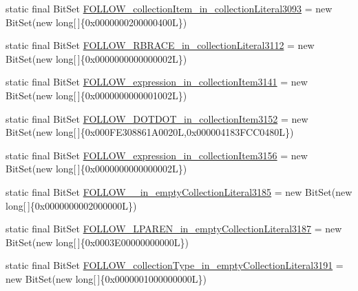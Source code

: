 \begin{DoxyCompactItemize}
\item 
static final Bit\-Set \hyperlink{classorg_1_1tzi_1_1use_1_1parser_1_1testsuite_1_1_test_suite_parser_ac31ee4b7f93a1bf0b5f8b2c54f51bcce}{F\-O\-L\-L\-O\-W\-\_\-collection\-Item\-\_\-in\-\_\-collection\-Literal3093} = new Bit\-Set(new long\mbox{[}$\,$\mbox{]}\{0x0000000200000400\-L\})
\item 
static final Bit\-Set \hyperlink{classorg_1_1tzi_1_1use_1_1parser_1_1testsuite_1_1_test_suite_parser_aa49fe7bf4db7bc2872a9d5f05738c86f}{F\-O\-L\-L\-O\-W\-\_\-\-R\-B\-R\-A\-C\-E\-\_\-in\-\_\-collection\-Literal3112} = new Bit\-Set(new long\mbox{[}$\,$\mbox{]}\{0x0000000000000002\-L\})
\item 
static final Bit\-Set \hyperlink{classorg_1_1tzi_1_1use_1_1parser_1_1testsuite_1_1_test_suite_parser_ad1485a2c0c1046e9fbf8bbceff52b4c1}{F\-O\-L\-L\-O\-W\-\_\-expression\-\_\-in\-\_\-collection\-Item3141} = new Bit\-Set(new long\mbox{[}$\,$\mbox{]}\{0x0000000000001002\-L\})
\item 
static final Bit\-Set \hyperlink{classorg_1_1tzi_1_1use_1_1parser_1_1testsuite_1_1_test_suite_parser_a3b3c2800e465a4a66a7b11663d6661fd}{F\-O\-L\-L\-O\-W\-\_\-\-D\-O\-T\-D\-O\-T\-\_\-in\-\_\-collection\-Item3152} = new Bit\-Set(new long\mbox{[}$\,$\mbox{]}\{0x000\-F\-E308861\-A0020\-L,0x000004183\-F\-C\-C0480\-L\})
\item 
static final Bit\-Set \hyperlink{classorg_1_1tzi_1_1use_1_1parser_1_1testsuite_1_1_test_suite_parser_a23c6501023c6c188a8273095e0747922}{F\-O\-L\-L\-O\-W\-\_\-expression\-\_\-in\-\_\-collection\-Item3156} = new Bit\-Set(new long\mbox{[}$\,$\mbox{]}\{0x0000000000000002\-L\})
\item 
static final Bit\-Set \hyperlink{classorg_1_1tzi_1_1use_1_1parser_1_1testsuite_1_1_test_suite_parser_a9bfd915d94f9bec9d616de6415fad3cc}{F\-O\-L\-L\-O\-W\-\_\-\_\-in\-\_\-empty\-Collection\-Literal3185} = new Bit\-Set(new long\mbox{[}$\,$\mbox{]}\{0x0000000002000000\-L\})
\item 
static final Bit\-Set \hyperlink{classorg_1_1tzi_1_1use_1_1parser_1_1testsuite_1_1_test_suite_parser_a1d25887b715396097856c9a77e58dcab}{F\-O\-L\-L\-O\-W\-\_\-\-L\-P\-A\-R\-E\-N\-\_\-in\-\_\-empty\-Collection\-Literal3187} = new Bit\-Set(new long\mbox{[}$\,$\mbox{]}\{0x0003\-E00000000000\-L\})
\item 
static final Bit\-Set \hyperlink{classorg_1_1tzi_1_1use_1_1parser_1_1testsuite_1_1_test_suite_parser_a42c8745b563e0c613d85ab28a6a75142}{F\-O\-L\-L\-O\-W\-\_\-collection\-Type\-\_\-in\-\_\-empty\-Collection\-Literal3191} = new Bit\-Set(new long\mbox{[}$\,$\mbox{]}\{0x0000001000000000\-L\})

\end{DoxyCompactItemize}
